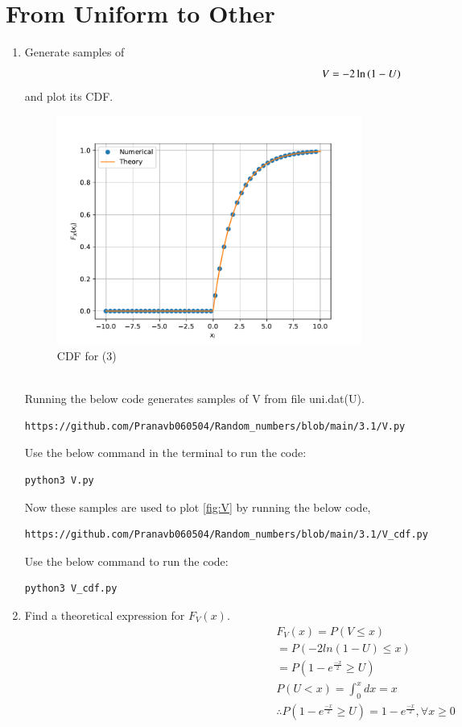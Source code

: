 \documentclass[journal,12pt,twocolumn]{IEEEtran}
\renewcommand\thesection{\arabic{section}}
\begin{document}
\section{From Uniform to Other}
\begin{enumerate}[label=\thesection.\arabic*
,ref=\thesection.\theenumi]
%
\item
Generate samples of 
%
\begin{equation}
V = -2\ln\left(1-U\right)
\end{equation}
%
and plot its CDF.\\ 
 \begin{figure}[h]
\includegraphics[width=0.5\textwidth]{V_cdf.pdf}
\caption{CDF for (3)}
\label{fig:V}
\end{figure}
\\ 
\solution
Running the below code generates samples of V from file uni.dat(U).
\begin{lstlisting}
https://github.com/Pranavb060504/Random_numbers/blob/main/3.1/V.py
\end{lstlisting}
Use the below command in the terminal to run the code:
\begin{lstlisting}
python3 V.py
\end{lstlisting}
 
Now these samples are used to plot \eqref{fig:V} by running the below code,
\begin{lstlisting}
https://github.com/Pranavb060504/Random_numbers/blob/main/3.1/V_cdf.py
\end{lstlisting}
Use the below command to run the code:
\begin{lstlisting}
python3 V_cdf.py
\end{lstlisting}
\item Find a theoretical expression for $F_V(x)$.
\begin{align}
 &F_{V}(x)=P(V \leq x)\\
 &=P(-2 ln(1-U) \leq x)\\
 &=P(1-e^{\frac{-x}{2}} \geq U)\\
 &P(U<x)=\int_{0}^{x} dx=x\\
 &\therefore P(1-e^{\frac{-x}{2}} \geq U)=1-e^{\frac{-x}{2}}, \forall x\geq 0 \\ 
 \nonumber
 \end{align}
%
\end{enumerate}
\end{document}

